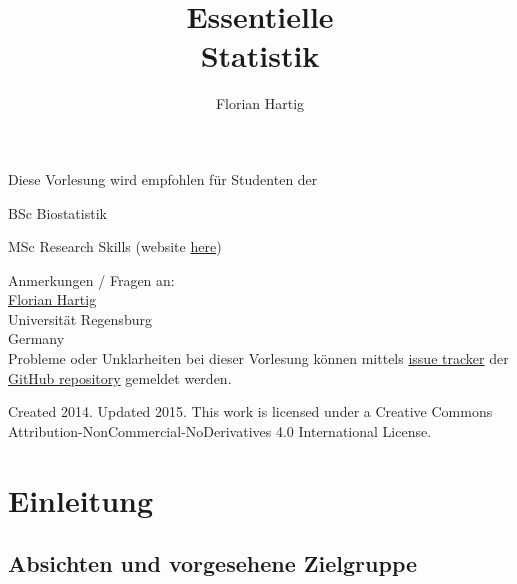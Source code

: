 \documentclass[a4paper,twoside]{tufte-book}\usepackage[]{graphicx}\usepackage[]{color}
\title{Essentielle\\Statistik}
\author{Florian Hartig}
\begin{document}

\let\cleardoublepage\clearpage %
\maketitle


\thispagestyle{empty}
\null

\begin{fullwidth}
Diese Vorlesung wird empfohlen für Studenten der

\begin{itemize*}
  \item BSc Biostatistik
  \item MSc Research Skills (website \href{http://florianhartig.github.io/ResearchSkills/}{here})
\end{itemize*}

\vspace{0.5cm}

Anmerkungen / Fragen an:\\[0.5cm]
\href{https://florianhartig.wordpress.com/}{Florian Hartig}\\
Universität Regensburg\\
Germany\\[0.5cm]

Probleme oder Unklarheiten bei dieser Vorlesung können mittels \href{https://github.com/florianhartig/Statistics/issues}{issue tracker} der \href{https://github.com/florianhartig/Statistics/tree/master/EssentialStatistics}{GitHub repository} gemeldet werden. 

\end{fullwidth}


\vfill
\begin{fullwidth}
Created 2014. Updated 2015. This work is licensed under a Creative Commons Attribution-NonCommercial-NoDerivatives 4.0 International License.
\end{fullwidth}


\newpage
\tableofcontents

\chapter{Einleitung} %

\section{Absichten und vorgesehene Zielgruppe}
\end{document}
